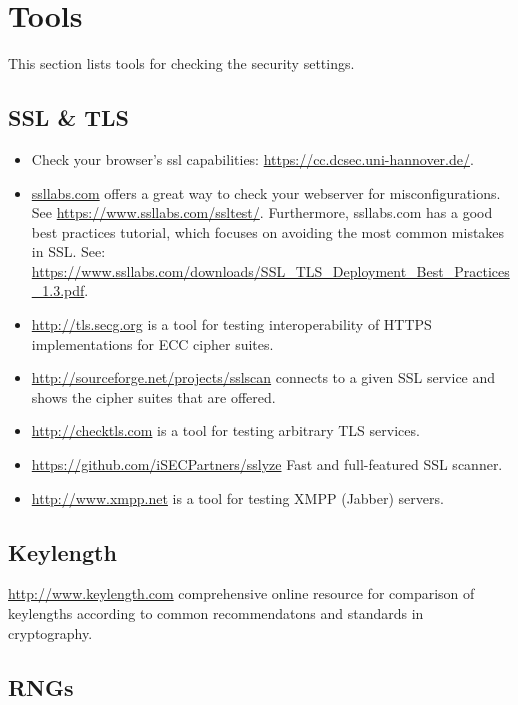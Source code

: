 \newpage
\section{Tools}
\label{section:Tools}
This section lists tools for checking the security settings.

\subsection{SSL \& TLS}

\begin{itemize}
\item Check your browser's ssl capabilities: \url{https://cc.dcsec.uni-hannover.de/}.
\item \href{http://ssllabs.com}{ssllabs.com} offers a great way to check your webserver for misconfigurations. See \url{https://www.ssllabs.com/ssltest/}.
Furthermore, ssllabs.com has a good best practices tutorial, which focuses on avoiding the most common mistakes in SSL.
See: \url{https://www.ssllabs.com/downloads/SSL_TLS_Deployment_Best_Practices_1.3.pdf}.
\item \url{http://tls.secg.org} is a tool for testing interoperability of HTTPS implementations for ECC cipher suites.
\item \url{http://sourceforge.net/projects/sslscan} connects to a given SSL service and shows the cipher suites that are offered.
\item \url{http://checktls.com} is a tool for testing arbitrary TLS services. 
\item \url{https://github.com/iSECPartners/sslyze} Fast and full-featured SSL scanner.
\item \url{http://www.xmpp.net} is a tool for testing XMPP (Jabber) servers.
\end{itemize}

\subsection{Keylength}

\url{http://www.keylength.com} comprehensive online resource for comparison of keylengths according to common recommendatons and standards in cryptography.

\subsection{RNGs}


